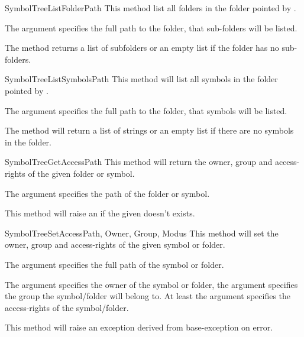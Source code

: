 \begin{methoddesc}[Core]{SymbolTreeListFolder}{Path}
This method list all folders in the folder pointed by .

The argument  specifies the full path to the folder, that sub-folders
will be listed. 

The method returns a list of subfolders or an empty list if the folder has no sub-folders.
\end{methoddesc}


\begin{methoddesc}[Core]{SymbolTreeListSymbols}{Path}
This method will list all symbols in the folder pointed by .

The argument  specifies the full path to the folder, that symbols
will be listed. 


The method will return a list of strings or an empty list if there are no 
symbols in the folder.
\end{methoddesc}


\begin{methoddesc}[Core]{SymbolTreeGetAccess}{Path}
This method will return the owner, group and access-rights of the given folder or symbol.

The argument  specifies the path of the folder or symbol.

This method will raise an  if the given  
doesn't exists.
\end{methoddesc}


\begin{methoddesc}[Core]{SymbolTreeSetAccess}{Path, Owner, Group, Modus}
This method will set the owner, group and access-rights of the given symbol or folder.

The argument  specifies the full path of the symbol or folder.

The argument  specifies the owner of the symbol or folder, the 
argument  specifies the group the symbol/folder will belong to.
At least the argument  specifies the access-rights of the
symbol/folder.

This method will raise an exception derived from  base-exception on error.
\end{methoddesc}



